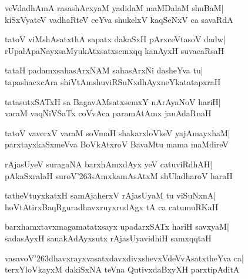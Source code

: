 \documentclass[twoside,12pt,openright]{book}
\def\S{\char'263}
\newcounter{shloka}[chapter]
\begin{document}
\begin{shloka}%
veVdadhAmA rasashAcxyaM yadidaM maMDalaM shuBaM|\\
kiSxVyateV vadhaRteV ceYva shukelxV kaqSeNxV ca savaRdA
\end{shloka}

\begin{shloka}%
tatoV viMshAsatxthA sapatx dakaSxH pArxceVtasoV dadw|\\
rUpalApaNayxsaMyukAtxsatxsemxqq kanAyxH suvacaRsaH
\end{shloka}

\begin{shloka}%
tataH padamxsahasArxNAM sahasArxNi dasheYva tu|\\
tapashacxcAra shiVtAmshuviRSuNxdhAyxneYkatatapxraH
\end{shloka}

\begin{shloka}%
tatasutxSATxH sa BagavAMsatxsemxY nArAyaNoV hariH|\\
varaM vaqNiVSaTx coVvAca paramAtAmx janAdaRnaH
\end{shloka}

\begin{shloka}%
tatoV vaverxV varaM soVmaH shakarxloVkeV yajAmayxhaM|\\
parxtayxkaSxmeVva BoVkAtxroV BavaMtu mama maMdireV
\end{shloka}

\begin{shloka}%
rAjasUyeV suragaNA barxhAmxdAyx yeV catuviRdhAH|\\
pAkaSxralaH suroV\S sAmxkamAsAtxM shUladharoV haraH
\end{shloka}

\begin{shloka}%
tatheVtuyxkatxH samAjaherxV rAjasUyaM tu viSuNxnA|\\
hoVtAtirxBaqRguradhavxruyxrudAgx tA ca catumuRKaH
\end{shloka}

\begin{shloka}%
barxhamxtavxmagamatatxsayx upadarxSATx hariH savxyaM|\\
sadasAyxH sanakAdAyxsutx rAjasUyavidhiH samxqqtaH
\end{shloka}

\begin{shloka}%
vasavoV\S dhavxrayxvasatxdavxdivxshevxVdeVvAsatxtheYva ca|\\
terxYloVkayxM dakiSxNA teVna QutivxdaBxyXH parxtipAditA
\end{shloka}
\end{document}
